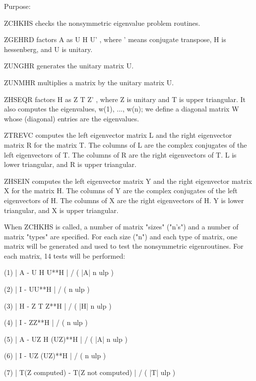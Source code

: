 \begin{DoxyParagraph}{Purpose\+: }
\begin{DoxyVerb}    ZCHKHS  checks the nonsymmetric eigenvalue problem routines.

            ZGEHRD factors A as  U H U' , where ' means conjugate
            transpose, H is hessenberg, and U is unitary.

            ZUNGHR generates the unitary matrix U.

            ZUNMHR multiplies a matrix by the unitary matrix U.

            ZHSEQR factors H as  Z T Z' , where Z is unitary and T
            is upper triangular.  It also computes the eigenvalues,
            w(1), ..., w(n); we define a diagonal matrix W whose
            (diagonal) entries are the eigenvalues.

            ZTREVC computes the left eigenvector matrix L and the
            right eigenvector matrix R for the matrix T.  The
            columns of L are the complex conjugates of the left
            eigenvectors of T.  The columns of R are the right
            eigenvectors of T.  L is lower triangular, and R is
            upper triangular.

            ZHSEIN computes the left eigenvector matrix Y and the
            right eigenvector matrix X for the matrix H.  The
            columns of Y are the complex conjugates of the left
            eigenvectors of H.  The columns of X are the right
            eigenvectors of H.  Y is lower triangular, and X is
            upper triangular.

    When ZCHKHS is called, a number of matrix "sizes" ("n's") and a
    number of matrix "types" are specified.  For each size ("n")
    and each type of matrix, one matrix will be generated and used
    to test the nonsymmetric eigenroutines.  For each matrix, 14
    tests will be performed:

    (1)     | A - U H U**H | / ( |A| n ulp )

    (2)     | I - UU**H | / ( n ulp )

    (3)     | H - Z T Z**H | / ( |H| n ulp )

    (4)     | I - ZZ**H | / ( n ulp )

    (5)     | A - UZ H (UZ)**H | / ( |A| n ulp )

    (6)     | I - UZ (UZ)**H | / ( n ulp )

    (7)     | T(Z computed) - T(Z not computed) | / ( |T| ulp )


\end{DoxyVerb}
\end{DoxyParagraph}
